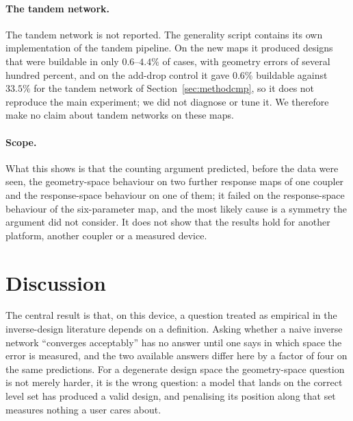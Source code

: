 \documentclass[11pt]{article}
\begin{document}
\paragraph{The tandem network.} The tandem network is not reported. The generality script contains its own implementation of the tandem pipeline. On the new maps it produced designs that were buildable in only $0.6$--$4.4\%$ of cases, with geometry errors of several hundred percent, and on the add-drop control it gave $0.6\%$ buildable against $33.5\%$ for the tandem network of Section~\ref{sec:methodcmp}, so it does not reproduce the main experiment; we did not diagnose or tune it. We therefore make no claim about tandem networks on these maps.

\paragraph{Scope.} What this shows is that the counting argument predicted, before the data were seen, the geometry-space behaviour on two further response maps of one coupler and the response-space behaviour on one of them; it failed on the response-space behaviour of the six-parameter map, and the most likely cause is a symmetry the argument did not consider. It does not show that the results hold for another platform, another coupler or a measured device.

\section{Discussion}

The central result is that, on this device, a question treated as empirical in the inverse-design literature depends on a definition. Asking whether a naive
inverse network ``converges acceptably'' has no answer until one says in which
space the error is measured, and the two available answers differ here by a
factor of four on the same predictions. For a degenerate design space the
geometry-space question is not merely harder, it is the wrong question: a
model that lands on the correct level set has produced a valid design, and
penalising its position along that set measures nothing a user cares about.
\end{document}

